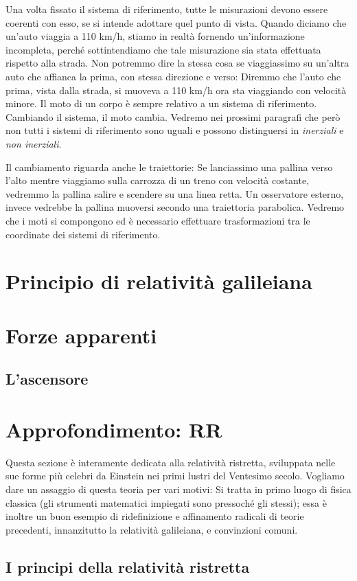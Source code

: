 Una volta fissato il sistema di riferimento, tutte le misurazioni devono
essere coerenti con esso, se si intende adottare quel punto di vista.
Quando diciamo che un'auto viaggia a 110 km/h, stiamo in realtà fornendo
un'informazione incompleta, perché sottintendiamo che tale misurazione
sia stata effettuata rispetto alla strada. Non potremmo dire la stessa
cosa se viaggiassimo su un'altra auto che affianca la prima, con stessa
direzione e verso: Diremmo che
l'auto che prima, vista dalla strada, si muoveva a 110 km/h ora sta viaggiando con velocità
minore. Il moto di un corpo è sempre relativo a un sistema di riferimento.
Cambiando il sistema, il moto cambia. Vedremo nei prossimi paragrafi
che però non tutti i sistemi di riferimento sono uguali e possono
distinguersi in \textit{inerziali} e \textit{non inerziali}.

Il cambiamento riguarda anche le traiettorie: Se lanciassimo una pallina
verso l'alto mentre viaggiamo sulla carrozza di un treno con velocità
costante, vedremmo la pallina salire e scendere su una linea retta.
Un osservatore esterno, invece vedrebbe la pallina muoversi secondo
una traiettoria parabolica. Vedremo che i moti si compongono
ed è necessario effettuare trasformazioni tra le coordinate dei
sistemi di riferimento.

\section{Principio di relatività galileiana}


\section{Forze apparenti}


\subsection{L'ascensore}

\section{Approfondimento: RR}
Questa sezione è interamente dedicata alla relatività ristretta, sviluppata
nelle sue forme più celebri da Einstein nei primi lustri del Ventesimo secolo.
Vogliamo dare un assaggio di questa teoria per vari motivi: Si tratta in primo
luogo di fisica classica (gli strumenti matematici impiegati sono pressoché gli stessi); essa è inoltre un buon esempio di ridefinizione e affinamento
radicali di teorie precedenti, innanzitutto la relatività galileiana, e convinzioni
comuni.

\subsection{I principi della relatività ristretta}